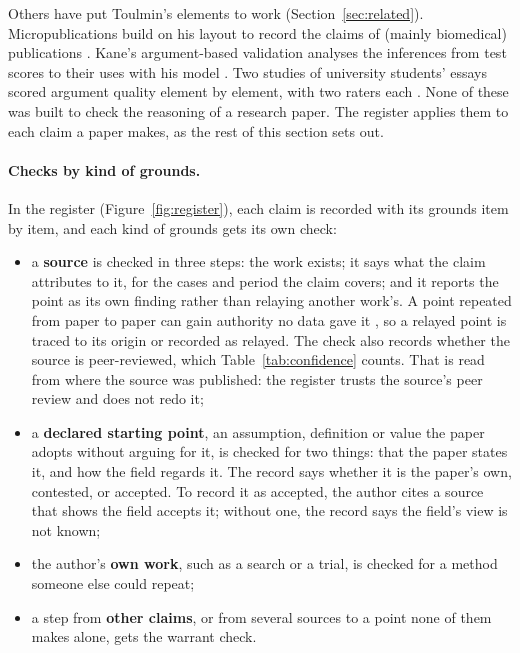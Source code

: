 \documentclass[12pt, a4paper]{article}
\begin{document}
Others have put Toulmin's elements to work (Section~\ref{sec:related}).  Micropublications build on his
layout to record the claims of (mainly biomedical) publications
\citep{clark2014}.  Kane's argument-based validation analyses the
inferences from test scores to their uses with his model
\citep[pp.~11--12]{kane2013}.  Two studies of university students' essays
scored argument quality element by element, with two raters each
\citep{yang2022,divya2026}.  None of these was built to check the reasoning of a
research paper.  The register applies them to each claim a paper makes,
as the rest of this section sets out.

\paragraph{Checks by kind of grounds.}
In the register (Figure~\ref{fig:register}), each claim is recorded with its grounds item by item,
and each kind of grounds gets its own check:
\begin{itemize}
\item a \textbf{source} is checked in three steps: the work exists; it
  says what the claim attributes to it, for the cases and period the
  claim covers; and it reports the point as its own finding rather than
  relaying another work's.  A point repeated from paper to paper can
  gain authority no data gave it \citep{greenberg2009}, so a relayed
  point is traced to its origin or recorded as relayed.  The check also
  records whether the source is peer-reviewed, which
  Table~\ref{tab:confidence} counts.  That is read from where the source
  was published: the register trusts the source's peer review and does
  not redo it;
\item a \textbf{declared starting point}, an assumption, definition
  or value the paper adopts without arguing for it, is checked for two
  things: that the paper states it, and how the field regards it.  The
  record says whether it is the paper's own, contested, or accepted.  To
  record it as accepted, the author cites a source that shows the field
  accepts it; without one, the record says the field's view is not
  known;
\item the author's \textbf{own work}, such as a search or a trial, is
  checked for a method someone else could repeat;
\item a step from \textbf{other claims}, or from several sources to a
  point none of them makes alone, gets the warrant check.
\end{itemize}
\end{document}
